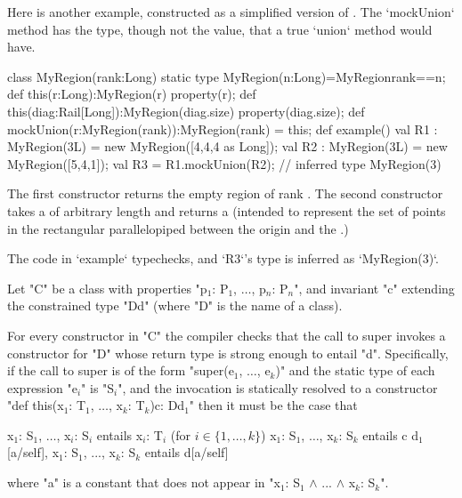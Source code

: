 \begin{ex}
Here is another example, constructed as a simplified 
version of .  The \xcd`mockUnion` method 
has the type, though not the value, that a true \xcd`union` method would have.

\begin{xten}
class MyRegion(rank:Long) {
  static type MyRegion(n:Long)=MyRegion{rank==n};
  def this(r:Long):MyRegion(r) {
    property(r);
  }
  def this(diag:Rail[Long]):MyRegion(diag.size){ 
    property(diag.size);
  }
  def mockUnion(r:MyRegion(rank)):MyRegion(rank) = this;
  def example() {
    val R1 : MyRegion(3L) = new MyRegion([4,4,4 as Long]); 
    val R2 : MyRegion(3L) = new MyRegion([5,4,1]); 
    val R3 = R1.mockUnion(R2); // inferred type MyRegion(3)
  }
}
\end{xten}
%
The first constructor returns the empty region of rank .  The
second constructor takes a  of arbitrary length
 and returns a  (intended to represent the set
of points in the rectangular parallelopiped between the origin and the
.)

The code in \xcd`example` typechecks, and \xcd`R3`'s type is inferred as
\xcd`MyRegion(3)`.  


\end{ex}

   Let \xcd"C" be a class with properties
   \xcdmath"p$_1$: P$_1$, $\dots$, p$_n$: P$_n$", and invariant \xcd"c"
   extending the constrained type \xcd"D{d}" (where \xcd"D" is the name of a
   class).



   For every constructor in \xcd"C" the compiler checks that the call to
   super invokes a constructor for \xcd"D" whose return type is strong enough
   to entail \xcd"d". Specifically, if the call to super is of the form 
     \xcdmath"super(e$_1$, $\dots$, e$_k$)"
   and the static type of each expression \xcdmath"e$_i$" is
   \xcdmath"S$_i$", and the invocation
   is statically resolved to a constructor
\xcdmath"def this(x$_1$: T$_1$, $\dots$, x$_k$: T$_k$){c}: D{d$_1$}"
   then it must be the case that 
\begin{xtenmath}
x$_1$: S$_1$, $\dots$, x$_i$: S$_i$ entails x$_i$: T$_i$  (for $i \in \{1, \dots, k\}$)
x$_1$: S$_1$, $\dots$, x$_k$: S$_k$ entails c  
d$_1$[a/self], x$_1$: S$_1$, ..., x$_k$: S$_k$ entails d[a/self]      
\end{xtenmath}
\noindent where \xcd"a" is a constant that does not appear in 
\xcdmath"x$_1$: S$_1$ $\wedge$ ... $\wedge$ x$_k$: S$_k$".

